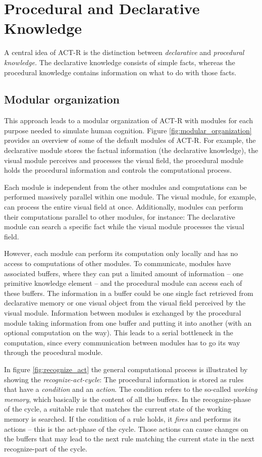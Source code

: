 \section{Procedural and Declarative Knowledge}

A central idea of ACT-R is the distinction between \emph{declarative} and \emph{procedural knowledge.} The declarative knowledge consists of simple facts, whereas the procedural knowledge contains information on what to do with those facts.

\subsection{Modular organization}

This approach leads to a modular organization of ACT-R with modules for each purpose needed to simulate human cognition. Figure \ref{fig:modular_organization} provides an overview of some of the default modules of ACT-R. For example, the declarative module stores the factual information (the declarative knowledge), the visual module perceives and processes the visual field, the procedural module holds the procedural information and controls the computational process. 

Each module is independent from the other modules and computations can be performed massively parallel within one module. The visual module, for example, can process the entire visual field at once. Additionally, modules can perform their computations parallel to other modules, for instance: The declarative module can search a specific fact while the visual module processes the visual field.

However, each module can perform its computation only locally and has no access to computations of other modules. To communicate, modules have associated buffers, where they can put a limited amount of information -- one primitive knowledge element -- and the procedural module can access each of these buffers. The information in a buffer could be one single fact retrieved from declarative memory or one visual object from the visual field perceived by the visual module. Information between modules is exchanged by the procedural module taking information from one buffer and putting it into another (with an optional computation on the way). This leads to a serial bottleneck in the computation, since every communication between modules has to go its way through the procedural module.

In figure \ref{fig:recognize_act} the general computational process is illustrated by showing the \emph{recognize-act-cycle}: The procedural information is stored as rules that have a \emph{condition} and an \emph{action}. The condition refers to the so-called \emph{working memory}, which basically is the content of all the buffers. In the recognize-phase of the cycle, a suitable rule that matches the current state of the working memory is searched. If the condition of a rule holds, it \emph{fires} and performs its actions -- this is the act-phase of the cycle. Those actions can cause changes on the buffers that may lead to the next rule matching the current state in the next recognize-part of the cycle.

